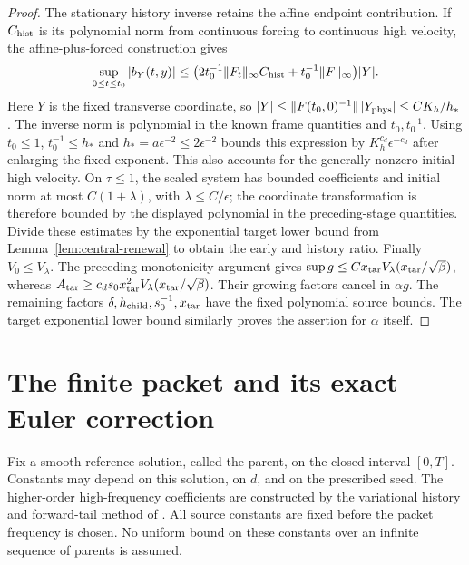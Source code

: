 \documentclass[11pt]{article}
\theoremstyle{definition}
\begin{document}
\begin{proof}
The stationary history inverse retains the affine endpoint contribution.
If $C_{\rm hist}$ is its polynomial norm from continuous forcing to
continuous high velocity, the affine-plus-forced construction gives
\[
 \sup_{0\leq t\leq t_0}|b_Y(t,y)|
 \leq \bigl(2t_0^{-1}\|F_t\|_\infty C_{\rm hist}
                 +t_0^{-1}\|F\|_\infty\bigr)|Y|.
\]
Here $Y$ is the fixed transverse coordinate, so
$|Y|\leq\|F(t_0,0)^{-1}\|\,|Y_{\rm phys}|\leq C K_h/h_*$.
The inverse norm is polynomial in the known frame quantities and
$t_0,t_0^{-1}$. Using $t_0\leq1$, $t_0^{-1}\leq h_*$ and
$h_*=a\epsilon^{-2}\leq2\epsilon^{-2}$ bounds this expression by
$K_h^{c_d}\epsilon^{-c_d}$ after enlarging the fixed exponent.
This also accounts for the generally nonzero initial high velocity.
On $\tau\leq1$, the scaled system has bounded
coefficients and initial norm at most $C(1+\lambda)$, with
$\lambda\leq C/\epsilon$; the coordinate transformation is therefore bounded by
the displayed polynomial in the preceding-stage quantities. Divide these estimates by
the exponential target lower bound from
Lemma~\ref{lem:central-renewal} to obtain the early and history ratio.
Finally $V_0\leq V_\lambda$. The preceding monotonicity argument gives
$\sup g\leq C x_{\rm tar}V_\lambda(x_{\rm tar}/\sqrt\beta)$,
whereas
$A_{\rm tar}\geq c_d s_0x_{\rm tar}^2
V_\lambda(x_{\rm tar}/\sqrt\beta)$.
Their growing factors cancel in $\alpha g$. The remaining factors
$\delta,h_{\rm child},s_0^{-1},x_{\rm tar}$ have the fixed polynomial
source bounds. The target exponential lower bound similarly proves
the assertion for $\alpha$ itself.
\end{proof}
\section{The finite packet and its exact Euler correction}\label{sec:exact-packet}

Fix a smooth reference solution, called the parent, on the closed
interval $[0,T]$. Constants may depend on this solution, on $d$,
and on the prescribed seed. The higher-order high-frequency coefficients
are constructed by the variational history and forward-tail method of
\cite[\S3]{OAI}. All source constants are fixed before the packet frequency
is chosen. No uniform bound on these constants over an infinite sequence
of parents is assumed.
\end{document}
